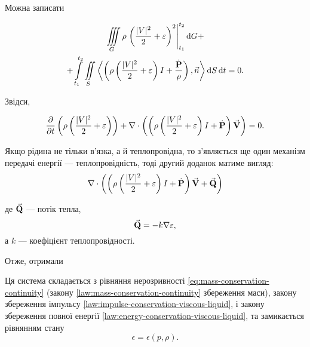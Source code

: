 Можна записати
\begin{law}
	\begin{multline}
		\Iiint_G \rho \left. \left( \frac{|V|^2}{2} + \epsilon\right)^2 \right|_{t_1}^{t_2} \diff G + \\
		+\Int_{t_1}^{t_2} \Iint_S \langle \left(\rho \left(\frac{|V|^2}{2} + \epsilon \right)I+\frac{\dot{\bf{P}}}{\rho}\right),\vec n\rangle \diff S \diff t = 0.
	\end{multline}
\end{law}

Звідси, 
\begin{law}
	\label{law:energy-conservation-viscous-liquid}
	\begin{equation}
		\label{eq:energy-conservation-viscous-liquid}
		\frac{\partial}{\partial t} \left( \rho \left( \frac{|V|^2}{2} + \varepsilon\right)\right) + \nabla \cdot \left( \left( \rho \left(\frac{|V|^2}{2} + \varepsilon\right)I + \dot{\textbf{P}}\right) {\vec{\mathbf{V}}} \right) = 0.
	\end{equation}
\end{law}

Якщо рідина не тільки в'язка, а й теплопровідна, то з'являється ще один механізм передачі енергії --- теплопровідність, тоді другий доданок матиме вигляд:
\begin{equation}
	\nabla \cdot \left( \left( \rho \left(\frac{|V|^2}{2} + \varepsilon\right)I + \dot{\textbf{P}}\right) {\vec{\mathbf{V}}} + {\vec{\mathbf{Q}}}\right)
\end{equation}

де ${\vec{\mathbf{Q}}}$ --- потік тепла,
\begin{equation}
	{\vec{\mathbf{Q}}} = - k \nabla \varepsilon,
\end{equation}
а $k$ --- коефіцієнт теплопровідності. \medskip

Отже, отримали
\begin{th_equation}
	Ця система складається з рівняння нерозривності \eqref{eq:mass-conservation-continuity} (закону \ref{law:mass-conservation-continuity} збереження маси), закону збереження імпульсу \ref{law:impulse-conservation-viscous-liquid}, і закону збереження повної енергії \ref{law:energy-conservation-viscous-liquid}, та замикається рівнянням стану
	\begin{equation}
		\epsilon = \epsilon(p, \rho).
	\end{equation}
\end{th_equation}

